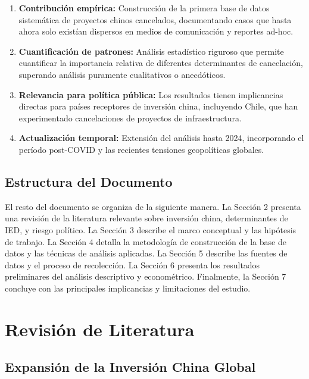 \documentclass[12pt]{article}
\begin{document}
\begin{enumerate}
    \item \textbf{Contribución empírica:} Construcción de la primera base de datos sistemática de proyectos chinos cancelados, documentando casos que hasta ahora solo existían dispersos en medios de comunicación y reportes ad-hoc.
    
    \item \textbf{Cuantificación de patrones:} Análisis estadístico riguroso que permite cuantificar la importancia relativa de diferentes determinantes de cancelación, superando análisis puramente cualitativos o anecdóticos.
    
    \item \textbf{Relevancia para política pública:} Los resultados tienen implicancias directas para países receptores de inversión china, incluyendo Chile, que han experimentado cancelaciones de proyectos de infraestructura.
    
    \item \textbf{Actualización temporal:} Extensión del análisis hasta 2024, incorporando el período post-COVID y las recientes tensiones geopolíticas globales.
\end{enumerate}

\subsection{Estructura del Documento}

El resto del documento se organiza de la siguiente manera. La Sección 2 presenta una revisión de la literatura relevante sobre inversión china, determinantes de IED, y riesgo político. La Sección 3 describe el marco conceptual y las hipótesis de trabajo. La Sección 4 detalla la metodología de construcción de la base de datos y las técnicas de análisis aplicadas. La Sección 5 describe las fuentes de datos y el proceso de recolección. La Sección 6 presenta los resultados preliminares del análisis descriptivo y econométrico. Finalmente, la Sección 7 concluye con las principales implicancias y limitaciones del estudio.

\section{Revisión de Literatura}

\subsection{Expansión de la Inversión China Global}
\end{document}
